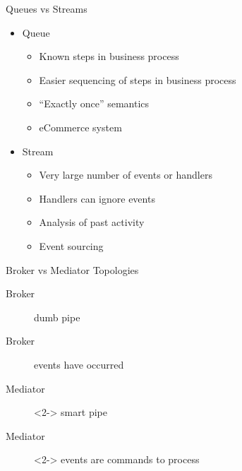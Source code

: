 \documentclass{slide}
\begin{document}
\begin{frame}{Queues vs Streams}
    \vspace{1mm}
    {\LARGE
    \begin{itemize}
        \item Queue
        \begin{itemize}
            \Large\item Known steps in business process
            \Large\item Easier sequencing of steps in business process
            \Large\item ``Exactly once'' semantics
            \Large\item eCommerce system
        \end{itemize}
        \vspace{3mm}
        \item<2-> Stream
        \begin{itemize}
            \Large\item Very large number of events or handlers
            \Large\item Handlers can ignore events
            \Large\item Analysis of past activity
            \Large\item Event sourcing
        \end{itemize}
    \end{itemize}
    }
\end{frame}

\begin{frame}{Broker vs Mediator Topologies}
    \vspace{1mm}
    {\LARGE
    \begin{description}
        \item[Broker] dumb pipe
        \vspace{3mm}
        \item[Broker] events have occurred
        \vspace{3mm}
        \item[Mediator]<2-> smart pipe
        \vspace{3mm}
        \item[Mediator]<2-> events are commands to process
    \end{description}
    }
\end{frame}
\end{document}
